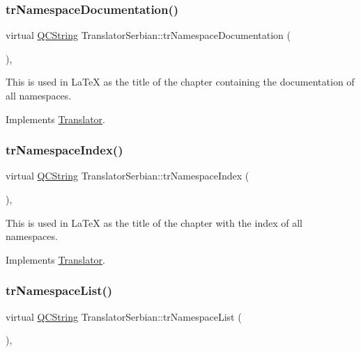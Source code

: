 \subsubsection{\texorpdfstring{trNamespaceDocumentation()}{trNamespaceDocumentation()}}
{\footnotesize\ttfamily virtual \mbox{\hyperlink{class_q_c_string}{Q\+C\+String}} Translator\+Serbian\+::tr\+Namespace\+Documentation (\begin{DoxyParamCaption}{ }\end{DoxyParamCaption})\hspace{0.3cm}{\ttfamily [inline]}, {\ttfamily [virtual]}}

This is used in La\+TeX as the title of the chapter containing the documentation of all namespaces. 

Implements \mbox{\hyperlink{class_translator}{Translator}}.

\mbox{\label{class_translator_serbian_a4e9dbaf6be2b393469a2412b1847a89c}} 
\subsubsection{\texorpdfstring{trNamespaceIndex()}{trNamespaceIndex()}}
{\footnotesize\ttfamily virtual \mbox{\hyperlink{class_q_c_string}{Q\+C\+String}} Translator\+Serbian\+::tr\+Namespace\+Index (\begin{DoxyParamCaption}{ }\end{DoxyParamCaption})\hspace{0.3cm}{\ttfamily [inline]}, {\ttfamily [virtual]}}

This is used in La\+TeX as the title of the chapter with the index of all namespaces. 

Implements \mbox{\hyperlink{class_translator}{Translator}}.

\mbox{\label{class_translator_serbian_ae53e9508803052433fea04a748624dcf}} 
\subsubsection{\texorpdfstring{trNamespaceList()}{trNamespaceList()}}
{\footnotesize\ttfamily virtual \mbox{\hyperlink{class_q_c_string}{Q\+C\+String}} Translator\+Serbian\+::tr\+Namespace\+List (\begin{DoxyParamCaption}{ }\end{DoxyParamCaption})\hspace{0.3cm}{\ttfamily [inline]}, {\ttfamily [virtual]}}

